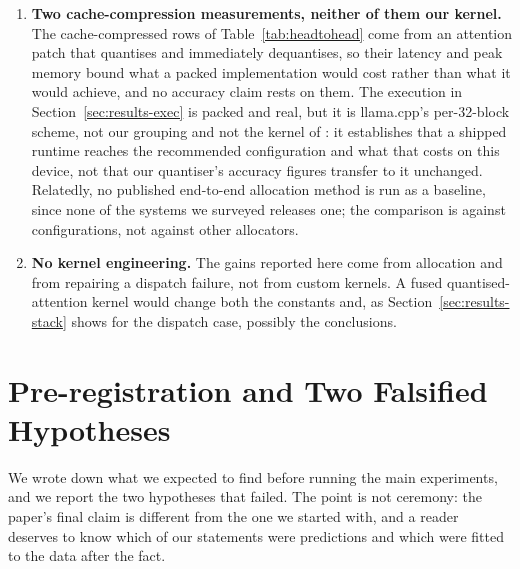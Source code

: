 \documentclass[5p]{elsarticle}
\begin{document}
\begin{enumerate}
\item \textbf{Two cache-compression measurements, neither of them our kernel.} The
      cache-compressed rows of Table~\ref{tab:headtohead} come from an attention
      patch that quantises and immediately dequantises, so their latency and peak
      memory bound what a packed implementation would cost rather than what it would
      achieve, and no accuracy claim rests on them. The execution in
      Section~\ref{sec:results-exec} is packed and real, but it is llama.cpp's
      per-32-block scheme, not our grouping and not the kernel of \cite{kivi}: it
      establishes that a shipped runtime reaches the recommended configuration and
      what that costs on this device, not that our quantiser's accuracy figures
      transfer to it unchanged. Relatedly, no published end-to-end allocation method is run as
      a baseline, since none of the systems we surveyed releases one; the
      comparison is against configurations, not against other allocators.

\item \textbf{No kernel engineering.} The gains reported here come from allocation
      and from repairing a dispatch failure, not from custom kernels. A fused
      quantised-attention kernel would change both the constants and, as
      Section~\ref{sec:results-stack} shows for the dispatch case, possibly the
      conclusions.
\end{enumerate}

\appendix
\section{Pre-registration and Two Falsified Hypotheses}
\label{app:prereg}

We wrote down what we expected to find before running the main experiments, and
we report the two hypotheses that failed. The point is not ceremony: the paper's
final claim is different from the one we started with, and a reader deserves to
know which of our statements were predictions and which were fitted to the data
after the fact.
\end{document}

